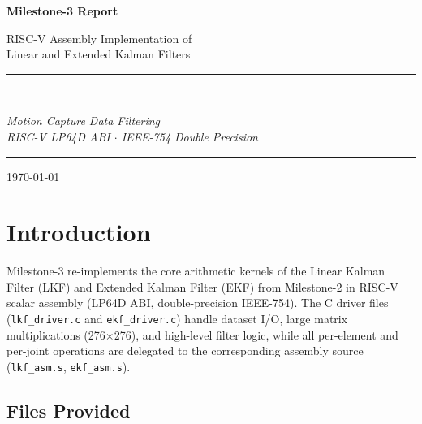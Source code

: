 \documentclass[12pt,a4paper]{article}
\begin{document}
\begin{titlepage}
  \centering
  \vspace*{2cm}
  {\Huge\bfseries\color{riscvblue} Milestone-3 Report\par}
  \vspace{0.4cm}
  {\large RISC-V Assembly Implementation of\\
         Linear and Extended Kalman Filters\par}
  \vspace{1.5cm}
  \rule{0.8\textwidth}{0.4pt}\\[0.6cm]
  {\large\itshape Motion Capture Data Filtering\\[0.3cm]
          RISC-V LP64D ABI $\cdot$ IEEE-754 Double Precision\par}
  \rule{0.8\textwidth}{0.4pt}
  \vfill
  {\large \today\par}
\end{titlepage}

\tableofcontents
\clearpage

\section{Introduction}
\label{sec:intro}

Milestone-3 re-implements the core arithmetic kernels of the Linear
Kalman Filter (LKF) and Extended Kalman Filter (EKF) from
Milestone-2 in RISC-V scalar assembly (LP64D ABI, double-precision
IEEE-754). The C driver files (\texttt{lkf\_driver.c} and
\texttt{ekf\_driver.c}) handle dataset I/O, large matrix
multiplications (276$\times$276), and high-level filter logic, while
all per-element and per-joint operations are delegated to the
corresponding assembly source (\texttt{lkf\_asm.s},
\texttt{ekf\_asm.s}).

\subsection{Files Provided}
\end{document}
